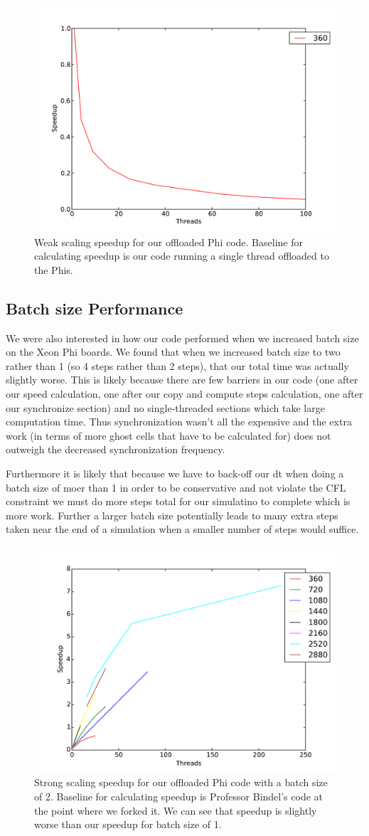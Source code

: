 \begin{figure}[h!]
\includegraphics[width=0.5\linewidth]{mic_weak_mic_baseline.pdf}
\caption{Weak scaling speedup for our offloaded Phi code. Baseline for calculating speedup is our code running a single thread offloaded to the Phis.}
\end{figure}

\subsection{Batch size Performance}

We were also interested in how our code performed when we increased batch size on the Xeon Phi boards. We found that when we increased batch size to two rather than 1 (so 4 steps rather than 2 steps), that our total time was actually slightly worse. This is likely because there are few barriers in our code (one after our speed calculation, one after our copy and compute steps calculation, one after our synchronize section) and no single-threaded sections which take large computation time. Thus synchronization wasn't all the expensive and the extra work (in terms of more ghost cells that have to be calculated for) does not outweigh the decreased synchronization frequency.

Furthermore it is likely that because we have to back-off our dt when doing a batch size of moer than 1 in order to be conservative and not violate the CFL constraint we must do more steps total for our simulatino to complete which is more work. Further a larger batch size potentially leads to many extra steps taken near the end of a simulation when a smaller number of steps would suffice.

\begin{figure}[h!]
\includegraphics[width=0.5\linewidth]{mic_strong_bindel_baseline_batchsize2.pdf}
\caption{Strong scaling speedup for our offloaded Phi code with a batch size of 2. Baseline for calculating speedup is Professor Bindel's code at the point where we forked it. We can see that speedup is slightly worse than our speedup for batch size of 1.}
\end{figure}
